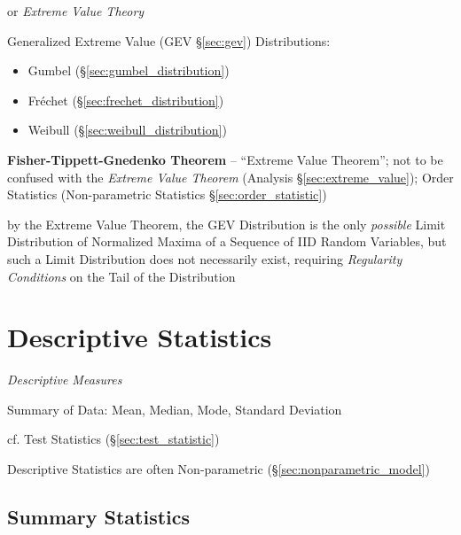 or \emph{Extreme Value Theory}

Generalized Extreme Value (GEV \S\ref{sec:gev}) Distributions:

\begin{itemize}
  \item Gumbel (\S\ref{sec:gumbel_distribution})
  \item Fr\'echet (\S\ref{sec:frechet_distribution})
  \item Weibull (\S\ref{sec:weibull_distribution})
\end{itemize}

\textbf{Fisher-Tippett-Gnedenko Theorem} -- ``Extreme Value Theorem''; not to be
confused with the \emph{Extreme Value Theorem} (Analysis
\S\ref{sec:extreme_value}); Order Statistics (Non-parametric Statistics
\S\ref{sec:order_statistic})

by the Extreme Value Theorem, the GEV Distribution is the only \emph{possible}
Limit Distribution of Normalized Maxima of a Sequence of IID Random Variables,
but such a Limit Distribution does not necessarily exist, requiring
\emph{Regularity Conditions} on the Tail of the Distribution



\section{Descriptive Statistics}\label{sec:descriptive_statistics}

\emph{Descriptive Measures}

Summary of Data: Mean, Median, Mode, Standard Deviation

cf. Test Statistics (\S\ref{sec:test_statistic})

Descriptive Statistics are often Non-parametric
(\S\ref{sec:nonparametric_model})



\subsection{Summary Statistics}\label{sec:summary_statistics}


